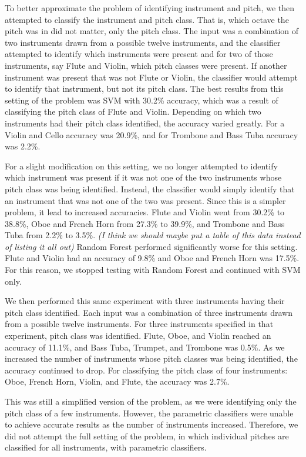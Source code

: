 \documentclass{article}
\begin{document}
To better approximate the problem of identifying instrument and pitch, we then attempted to classify the instrument and pitch class. That is, which octave the pitch was in did not matter, only the pitch class. The input was a combination of two instruments drawn from a possible twelve instruments, and the classifier attempted to identify which instruments were present and for two of those instruments, say Flute and Violin, which pitch classes were present. If another instrument was present that was not Flute or Violin, the classifier would attempt to identify that instrument, but not its pitch class. The best results from this setting of the problem was SVM with 30.2\% accuracy, which was a result of classifying the pitch class of Flute and Violin. Depending on which two instruments had their pitch class identified, the accuracy varied greatly. For a Violin and Cello accuracy was 20.9\%, and for Trombone and Bass Tuba accuracy was 2.2\%.

For a slight modification on this setting, we no longer attempted to identify which instrument was present if it was not one of the two instruments whose pitch class was being identified. Instead, the classifier would simply identify that an instrument that was not one of the two was present. Since this is a simpler problem, it lead to increased accuracies. Flute and Violin went from 30.2\% to 38.8\%, Oboe and French Horn from 27.3\% to 39.9\%, and Trombone and Bass Tuba from 2.2\% to 3.5\%. \textit{(I think we should maybe put a table of this data instead of listing it all out)} Random Forest performed significantly worse for this setting. Flute and Violin had an accuracy of 9.8\% and Oboe and French Horn was 17.5\%. For this reason, we stopped testing with Random Forest and continued with SVM only.

We then performed this same experiment with three instruments having their pitch class identified. Each input was a combination of three instruments drawn from a possible twelve instruments. For three instruments specified in that experiment, pitch class was identified. Flute, Oboe, and Violin reached an accuracy of 11.1\%, and Bass Tuba, Trumpet, and Trombone was 0.5\%. As we increased the number of instruments whose pitch classes was being identified, the accuracy continued to drop. For classifying the pitch class of four instruments: Oboe, French Horn, Violin, and Flute, the accuracy was 2.7\%.

This was still a simplified version of the problem, as we were identifying only the pitch class of a few instruments. However, the parametric classifiers were unable to achieve accurate results as the number of instruments increased. Therefore, we did not attempt the full setting of the problem, in which individual pitches are classified for all instruments, with parametric classifiers. 
\end{document}
